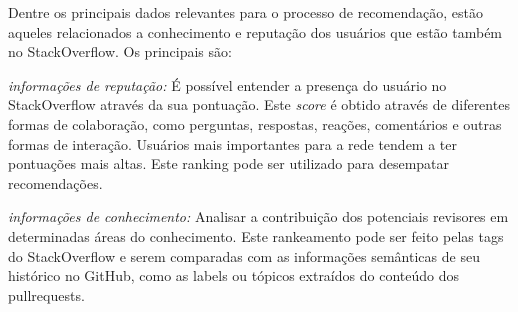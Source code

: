 \documentclass[a4paper,12pt]{monografia}
\theoremstyle{plain}
\theoremstyle{definition}
\theoremstyle{remark}
\begin{document}
Dentre os principais dados relevantes para o processo de recomendação, estão aqueles relacionados a conhecimento e reputação dos usuários que estão também no StackOverflow. Os principais são:

\textit{informações de reputação: } É possível entender a presença do usuário no StackOverflow através da sua pontuação. Este \textit{score} é obtido através de diferentes formas de colaboração, como perguntas, respostas, reações, comentários e outras formas de interação. Usuários mais importantes para a rede tendem a ter pontuações mais altas. Este ranking pode ser utilizado para desempatar recomendações.

\textit{informações de conhecimento: } Analisar a contribuição dos potenciais revisores em determinadas áreas do conhecimento. Este rankeamento pode ser feito pelas tags do StackOverflow e serem comparadas com as informações semânticas de seu histórico no GitHub, como as labels ou tópicos extraídos do conteúdo dos pullrequests.



\singlespacing



\end{document}
